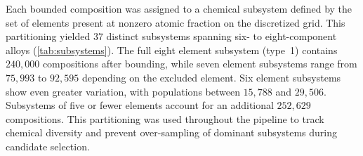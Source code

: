 \documentclass[final,5p,times,twocolumn]{elsarticle}
\begin{document}
Each bounded composition was assigned to a chemical subsystem defined by the set of elements present at nonzero atomic fraction on the discretized grid. This partitioning yielded 37 distinct subsystems spanning six- to eight-component alloys (\autoref{tab:subsystems}). The full eight element subsystem (type~1) contains $240{,}000$ compositions after bounding, while seven element subsystems range from $75{,}993$ to $92{,}595$ depending on the excluded element. Six element subsystems show even greater variation, with populations between $15{,}788$ and $29{,}506$. Subsystems of five or fewer elements account for an additional $252{,}629$ compositions. This partitioning was used throughout the pipeline to track chemical diversity and prevent over-sampling of dominant subsystems during candidate selection.
 
\onecolumn
\end{document}

